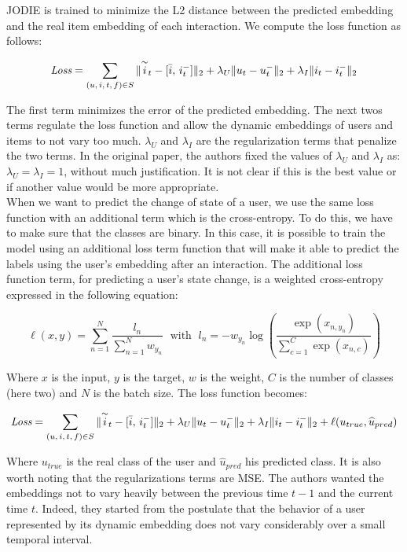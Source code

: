 JODIE is trained to minimize the L2 distance between the predicted embedding and the real item embedding of each interaction. We compute the loss function as follows:

\begin{equation}
    \textit{Loss} = \sum_{(u,\,i,\,t,\,f) \in S} \| \overset{\sim}{i}_t - [\Bar{i},\,i_t^-] \|_2 + \lambda_U \|u_t - u_t^-\|_2 + \lambda_I \|i_t - i_t^-\|_2
\end{equation}

The first term minimizes the error of the predicted embedding. The next twos terms regulate the loss function and allow the dynamic embeddings of users and items to not vary too much. $\lambda_U$ and $\lambda_I$ are the regularization terms that penalize the two terms. In the original paper, the authors fixed the values of $\lambda_U$ and $\lambda_I$ as: $\lambda_U = \lambda_I = 1$, without much justification. It is not clear if this is the best value or if another value would be more appropriate. \\

When we want to predict the change of state of a user, we use the same loss function with an additional term which is the cross-entropy. To do this, we have to make sure that the classes are binary. In this case, it is possible to train the model using an additional loss term function that will make it able to predict the labels using the user's embedding after an interaction. The additional loss function term, for predicting a user's state change, is a weighted cross-entropy expressed in the following equation:

\begin{equation}
    \ell(x,y) = \sum_{n=1}^N \frac{l_n}{\sum_{n=1}^N w_{y_n}} \; \text{ with } \;
    l_n = -w_{y_n} \log \left ( \frac{\exp(x_{n,y_n})}{\sum_{c=1}^C \exp(x_{n,c})} \right )
\end{equation}

Where $x$ is the input, $y$ is the target, $w$ is the weight, $C$ is the number of classes (here two) and $N$ is the batch size. The loss function becomes:

\begin{equation}
    \textit{Loss} = \sum_{(u,\,i,\,t,\,f) \in S} \| \overset{\sim}{i}_t - [\Bar{i},\,i_t^-] \|_2 + \lambda_U \|u_t - u_t^-\|_2 + \lambda_I \|i_t - i_t^-\|_2 + \ell (u_{true}, \widehat u_{pred})
\end{equation}

Where $u_{true}$ is the real class of the user and $\widehat u_{pred}$ his predicted class. It is also worth noting that the regularizations terms are MSE. The authors wanted the embeddings not to vary heavily between the previous time $t-1$ and the current time $t$. Indeed, they started from the postulate that the behavior of a user represented by its dynamic embedding does not vary considerably over a small temporal interval.\\

